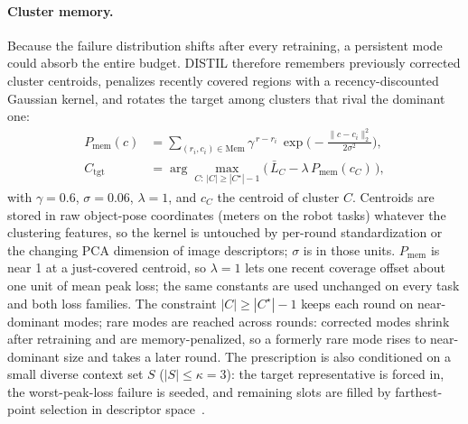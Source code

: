 \documentclass[letterpaper]{article} %
\begin{document}
\paragraph{Cluster memory.}
Because the failure distribution shifts after every retraining, a persistent
mode could absorb the entire budget. DISTIL therefore remembers previously
corrected cluster centroids, penalizes recently covered regions with a
recency-discounted Gaussian kernel, and rotates the target among clusters
that rival the dominant one:
\begin{align}
P_{\mathrm{mem}}(c)&=
\sum_{(r_i,c_i)\in\mathrm{Mem}}
\gamma^{\,r-r_i}\,
\exp\!\Big(-\tfrac{\|c-c_i\|_2^2}{2\sigma^2}\Big),
\nonumber\\
C_{\mathrm{tgt}}&=\arg\max_{C:\,|C|\ge|C^\star|-1}
\big(\,\bar L_C-\lambda\,P_{\mathrm{mem}}(c_C)\,\big),
\label{eq:memory}
\end{align}
with $\gamma{=}0.6$, $\sigma{=}0.06$, $\lambda{=}1$, and $c_C$ the centroid
of cluster $C$. Centroids are stored in raw object-pose coordinates (meters
on the robot tasks) whatever the clustering features, so the kernel is
untouched by per-round standardization or the changing PCA dimension of
image descriptors; $\sigma$ is in those units. $P_{\mathrm{mem}}$ is near 1
at a just-covered centroid, so $\lambda{=}1$ lets one recent coverage
offset about one unit of mean peak loss; the same constants are used
unchanged on every task and both loss families. The constraint
$|C|\ge|C^\star|-1$ keeps each round on near-dominant modes; rare modes are
reached across rounds: corrected modes shrink after retraining and are
memory-penalized, so a formerly rare mode rises to near-dominant size and
takes a later round. The prescription is
also conditioned on a small diverse context set $S$
($|S|\le\kappa{=}3$): the target representative is forced in, the
worst-peak-loss failure is seeded, and remaining slots are filled by
farthest-point selection in descriptor
space~\citep{sener2018coreset,eldar1997fps}.
\end{document}
